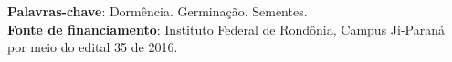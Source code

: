\documentclass[article,12pt,onesidea,4paper,english,brazil]{abntex2}
\begin{document}
	\vspace{\onelineskip}
	
	\noindent
	\textbf{Palavras-chave}: Dormência. Germinação. Sementes. \\
	\textbf{Fonte de financiamento}: Instituto Federal de Rondônia, Campus Ji-Paraná por meio do edital 35 de 2016. 
	
\end{document}
